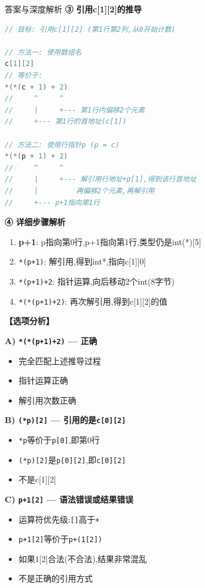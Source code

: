 \documentclass[a4paper,12pt]{article}
\begin{document}
\begin{bluebox}{答案与深度解析}
	\textbf{③ 引用c[1][2]的推导}

	\begin{lstlisting}[language=C]
// 目标: 引用c[1][2] (第1行第2列,从0开始计数)

// 方法一: 使用数组名
c[1][2]
// 等价于:
*(*(c + 1) + 2)
//     ^     ^
//     |     +--- 第1行内偏移2个元素
//     +--- 第1行的首地址(c[1])

// 方法二: 使用行指针p (p = c)
*(*(p + 1) + 2)
//     ^     ^
//     |     +--- 解引用行地址+p[1],得到该行首地址
//     |         再偏移2个元素,再解引用
//     +--- p+1指向第1行
    \end{lstlisting}

	\textbf{④ 详细步骤解析}
	\begin{enumerate}
		\item \textbf{p+1}: p指向第0行,p+1指向第1行,类型仍是int(*)[5]
		\item \texttt{*(p+1)}: 解引用,得到int*,指向c[1][0]
		\item \texttt{*(p+1)+2}: 指针运算,向后移动2个int(8字节)
		\item \texttt{*(*(p+1)+2)}: 再次解引用,得到c[1][2]的值
	\end{enumerate}

	\textbf{【选项分析】}

	\textbf{A) \texttt{*(*(p+1)+2)} — 正确}
	\begin{itemize}[leftmargin=*, nosep]
		\item 完全匹配上述推导过程
		\item 指针运算正确
		\item 解引用次数正确
	\end{itemize}

	\textbf{B) \texttt{(*p)[2]} — 引用的是\texttt{c[0][2]}}
	\begin{itemize}[leftmargin=*, nosep]
		\item \texttt{*p}等价于\texttt{p[0]},即第0行
		\item \texttt{(*p)[2]}是\texttt{p[0][2]},即\texttt{c[0][2]}
		\item 不是c[1][2]
	\end{itemize}

	\textbf{C) \texttt{p+1[2]} — 语法错误或结果错误}
	\begin{itemize}[leftmargin=*, nosep]
		\item 运算符优先级:\texttt{[]}高于\texttt{+}
		\item \texttt{p+1[2]}等价于\texttt{p+(1[2])}
		\item 如果1[2]合法(不合法),结果非常混乱
		\item 不是正确的引用方式
	\end{itemize}


\end{bluebox}
\end{document}
